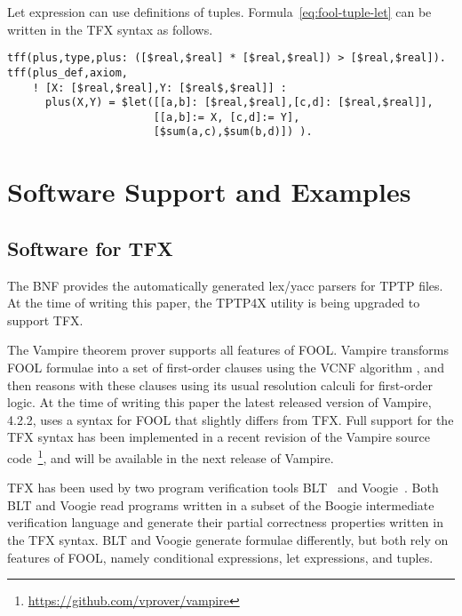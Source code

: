 \documentclass{easychair}
\begin{document}
Let expression can use definitions of tuples.
Formula~\ref{eq:fool-tuple-let} can be written in the TFX syntax as follows.
\begin{verbatim}
tff(plus,type,plus: ([$real,$real] * [$real,$real]) > [$real,$real]).
tff(plus_def,axiom,
    ! [X: [$real,$real],Y: [$real$,$real]] :
      plus(X,Y) = $let([[a,b]: [$real,$real],[c,d]: [$real,$real]],
                       [[a,b]:= X, [c,d]:= Y],
                       [$sum(a,c),$sum(b,d)]) ).
\end{verbatim}

\section{Software Support and Examples}
\label{ImplementationExamples}

\subsection{Software for TFX}
\label{Software}

The BNF provides the automatically generated lex/yacc parsers for TPTP files.
At the time of writing this paper, the TPTP4X utility is being upgraded
to support TFX.

The Vampire theorem prover \cite{KV13} supports all features of FOOL. 
Vampire transforms FOOL formulae into a set of first-order clauses using the 
VCNF algorithm \cite{KK+16-GCAI}, and then reasons with these clauses using 
its usual resolution calculi for first-order logic. 
At the time of writing this paper the latest released version of Vampire,
4.2.2, uses a syntax for FOOL that slightly differs from TFX. 
Full support for the TFX syntax has been implemented in a recent revision of 
the Vampire source code~\footnote{%
\url{https://github.com/vprover/vampire}}, and will be available
in the next release of Vampire.

TFX has been used by two program verification tools BLT~\cite{CF17} and
Voogie~\cite{KKV18}. 
Both BLT and Voogie read programs written in a subset of the Boogie 
intermediate verification language and generate their partial correctness 
properties written in the TFX syntax. 
BLT and Voogie generate formulae differently, but both rely on features of 
FOOL, namely conditional expressions, let expressions, and tuples.

\end{document}
